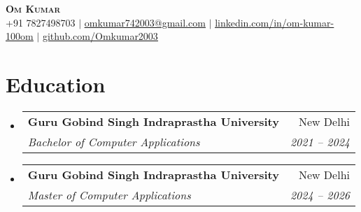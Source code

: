 \documentclass[letterpaper,11pt]{article}
\makeatletter
\newcommand{\resumeItem}[1]{
  \item\small{
    {#1 \vspace{-2pt}}
  }
}
\newcommand{\resumeSubheading}[4]{
  \vspace{-2pt}\item
    \begin{tabular*}{0.97\textwidth}[t]{l@{\extracolsep{\fill}}r}
      \textbf{#1} & #2 \\
      \textit{\small#3} & \textit{\small #4} \\
    \end{tabular*}\vspace{-7pt}
}
\newcommand{\resumeSubHeadingListStart}{\begin{itemize}[leftmargin=0.15in, label={}]}
\newcommand{\resumeSubHeadingListEnd}{\end{itemize}}
\newcommand{\resumeItemListStart}{\begin{itemize}}
\newcommand{\resumeItemListEnd}{\end{itemize}\vspace{-5pt}}
\makeatother
\begin{document}

\begin{center}
    \textbf{\Huge \scshape Om Kumar} \\ \vspace{1pt}
    \small +91 7827498703 $|$ \href{mailto:x@x.c}{\underline{omkumar742003@gmail.com}} $|$ 
    \href{https://www.linkedin.com/in/om-kumar-100om/}{\underline{linkedin.com/in/om-kumar-100om}}
    $|$
    \href{https://github.com/Omkumar2003}{\underline{github.com/Omkumar2003}}
\end{center}


\section{Education}
  \resumeSubHeadingListStart
    \resumeSubheading
      {Guru Gobind Singh Indraprastha University}{New Delhi}
      {Bachelor of Computer Applications}{2021 -- 2024}
    \resumeSubheading
      {Guru Gobind Singh Indraprastha University}{New Delhi}
      {Master of Computer Applications}{2024 -- 2026}
  \resumeSubHeadingListEnd



      
\end{document}

